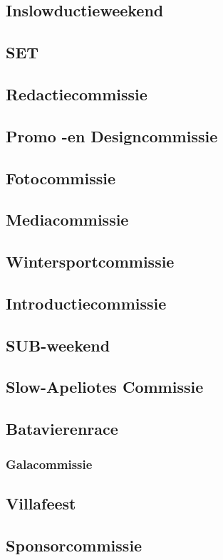 \documentclass[]{article}
\begin{document}
\subsection{Inslowductieweekend}

\subsection{SET}

\subsection{Redactiecommissie}

\subsection{Promo -en Designcommissie}

\subsection{Fotocommissie}

\subsection{Mediacommissie}

\subsection{Wintersportcommissie}

\subsection{Introductiecommissie}

\subsection{SUB-weekend}

\subsection{Slow-Apeliotes Commissie}

\subsection{Batavierenrace}

\subsubsection{Galacommissie}

\subsection{Villafeest}

\subsection{Sponsorcommissie}
\end{document}
